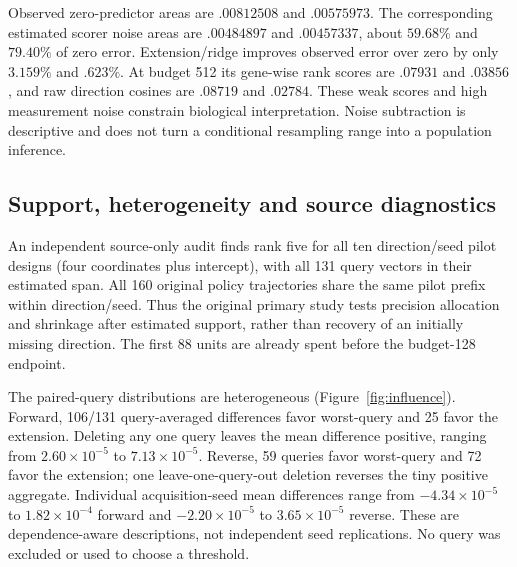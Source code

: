\begin{table}[htbp]
\centering\small
\caption{Post-primary comparisons with development-selected references. Differences and query ranges have units $10^{-5}$; negative changes favor the extension. Development's strongest overall point estimate was zero; reliability/CV ridge was its strongest paid combination. These are not new confirmatory tests.}
\label{tab:devrefs}

\end{table}

Observed zero-predictor areas are $.00812508$ and $.00575973$. The corresponding estimated scorer noise areas are $.00484897$ and $.00457337$, about $59.68\%$ and $79.40\%$ of zero error. Extension/ridge improves observed error over zero by only $3.159\%$ and $.623\%$. At budget 512 its gene-wise rank scores are $.07931$ and $.03856$, and raw direction cosines are $.08719$ and $.02784$. These weak scores and high measurement noise constrain biological interpretation. Noise subtraction is descriptive and does not turn a conditional resampling range into a population inference.

\subsection{Support, heterogeneity and source diagnostics}
An independent source-only audit finds rank five for all ten direction/seed pilot designs (four coordinates plus intercept), with all 131 query vectors in their estimated span. All 160 original policy trajectories share the same pilot prefix within direction/seed. Thus the original primary study tests precision allocation and shrinkage after estimated support, rather than recovery of an initially missing direction. The first 88 units are already spent before the budget-128 endpoint.

The paired-query distributions are heterogeneous (Figure~\ref{fig:influence}). Forward, 106/131 query-averaged differences favor worst-query and 25 favor the extension. Deleting any one query leaves the mean difference positive, ranging from $2.60\times10^{-5}$ to $7.13\times10^{-5}$. Reverse, 59 queries favor worst-query and 72 favor the extension; one leave-one-query-out deletion reverses the tiny positive aggregate. Individual acquisition-seed mean differences range from $-4.34\times10^{-5}$ to $1.82\times10^{-4}$ forward and $-2.20\times10^{-5}$ to $3.65\times10^{-5}$ reverse. These are dependence-aware descriptions, not independent seed replications. No query was excluded or used to choose a threshold.

